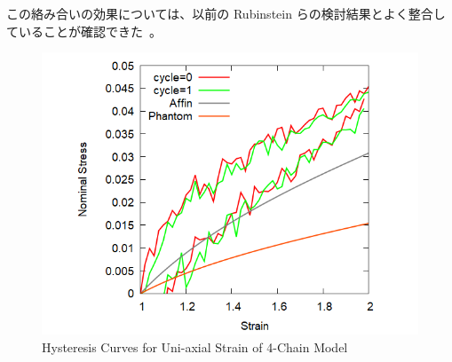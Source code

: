 \documentclass[uplatex,10pt,a4paper,twocolumn]{jsarticle}
\begin{document}
    この絡み合いの効果については、以前の Rubinstein らの検討結果とよく整合していることが確認できた~\cite{Rubinstein2002}。

    \begin{figure}[htb]
        \centering
            \includegraphics[width=.42\textwidth]{hyst_4Chain.png}
        \caption{Hysteresis Curves for Uni-axial Strain of 4-Chain Model}
        \label{fig:hyst}
        \end{figure}

    
    
\end{document}
